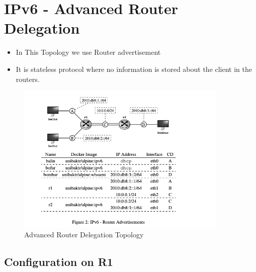 \chapter{IPv6 - Advanced Router Delegation}
\begin{itemize}
    \item In This Topology we use Router advertisement 
    \item It is stateless protocol where no information is stored about the client in the routers.
\end{itemize}
\label{IPv6 - Advanced Router Delegation}
\begin{figure}[H]
\centering
  \includegraphics[width=0.9\textwidth]{images/Topology-2.png}
  \caption{Advanced Router Delegation Topology}
  \label{fig:2.1 }
  \end{figure}
  \section{Configuration on R1}

